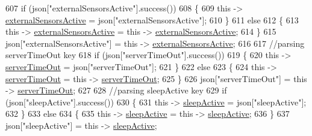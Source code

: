 \begin{DoxyCode}
607             \textcolor{keywordflow}{if} (json[\textcolor{stringliteral}{"externalSensorsActive"}].success())
608             \{
609                 \textcolor{keyword}{this} -> \hyperlink{classCoolBoard_a638b00b76aeb819ecfd4c10b8cdd7bb7}{externalSensorsActive} = json[\textcolor{stringliteral}{"externalSensorsActive"}];
610             \}
611             \textcolor{keywordflow}{else}
612             \{
613                 \textcolor{keyword}{this} -> \hyperlink{classCoolBoard_a638b00b76aeb819ecfd4c10b8cdd7bb7}{externalSensorsActive} = \textcolor{keyword}{this} -> 
      \hyperlink{classCoolBoard_a638b00b76aeb819ecfd4c10b8cdd7bb7}{externalSensorsActive};
614             \}
615             json[\textcolor{stringliteral}{"externalSensorsActive"}] = \textcolor{keyword}{this} -> \hyperlink{classCoolBoard_a638b00b76aeb819ecfd4c10b8cdd7bb7}{externalSensorsActive};
616 
617             \textcolor{comment}{//parsing serverTimeOut key}
618             \textcolor{keywordflow}{if} (json[\textcolor{stringliteral}{"serverTimeOut"}].success())
619             \{
620                 \textcolor{keyword}{this} -> \hyperlink{classCoolBoard_a7a8d8d3d316220cdd049cd63c1aa8fe6}{serverTimeOut} = json[\textcolor{stringliteral}{"serverTimeOut"}];
621             \}
622             \textcolor{keywordflow}{else}
623             \{
624                 \textcolor{keyword}{this} -> \hyperlink{classCoolBoard_a7a8d8d3d316220cdd049cd63c1aa8fe6}{serverTimeOut} = \textcolor{keyword}{this} -> \hyperlink{classCoolBoard_a7a8d8d3d316220cdd049cd63c1aa8fe6}{serverTimeOut};
625             \}
626             json[\textcolor{stringliteral}{"serverTimeOut"}] = \textcolor{keyword}{this} -> \hyperlink{classCoolBoard_a7a8d8d3d316220cdd049cd63c1aa8fe6}{serverTimeOut};
627             
628             \textcolor{comment}{//parsing sleepActive key}
629             \textcolor{keywordflow}{if} (json[\textcolor{stringliteral}{"sleepActive"}].success())
630             \{
631                 \textcolor{keyword}{this} -> \hyperlink{classCoolBoard_a0a51b2287139f66c738101fb53139230}{sleepActive} = json[\textcolor{stringliteral}{"sleepActive"}];
632             \}
633             \textcolor{keywordflow}{else}
634             \{
635                 \textcolor{keyword}{this} -> \hyperlink{classCoolBoard_a0a51b2287139f66c738101fb53139230}{sleepActive} = \textcolor{keyword}{this} -> \hyperlink{classCoolBoard_a0a51b2287139f66c738101fb53139230}{sleepActive};
636             \}
637             json[\textcolor{stringliteral}{"sleepActive"}] = \textcolor{keyword}{this} -> \hyperlink{classCoolBoard_a0a51b2287139f66c738101fb53139230}{sleepActive};

\end{DoxyCode}
